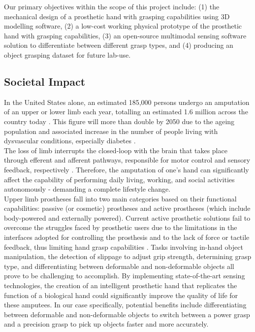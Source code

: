 \documentclass[11.5pt]{article}
\begin{document}
Our primary objectives within the scope of this project include: (1) the mechanical design of a prosthetic hand with grasping capabilities using 3D modelling software, (2) a low-cost working physical prototype of the prosthetic hand with grasping capabilities, (3) an open-source multimodal sensing software solution to differentiate between different grasp types, and (4) producing an object grasping dataset for future lab-use.

\subsection{Societal Impact}

In the United States alone, an estimated 185,000 persons undergo an amputation of an upper or lower limb each year, totalling an estimated 1.6 million across the country today \cite{Ziegler-Graham2008-cx}. This figure will more than double by 2050 due to the ageing population and associated increase in the number of people living with dysvascular conditions, especially diabetes \cite{Ziegler-Graham2008-cx}.\\

The loss of limb interrupts the closed-loop with the brain that takes place through efferent and afferent pathways, responsible for motor control and sensory feedback, respectively \cite{Cordella2016-ny}. Therefore, the amputation of one's hand can significantly affect the capability of performing daily living, working, and social activities autonomously - demanding a complete lifestyle change. \\

Upper limb prostheses fall into two main categories based on their functional capabilities: passive (or cosmetic) prostheses and active prostheses (which include body-powered and externally powered). Current active prosthetic solutions fail to overcome the struggles faced by prosthetic users due to the limitations in the interfaces adopted for controlling the prosthesis and to the lack of force or tactile feedback, thus limiting hand grasp capabilities \cite{Cordella2016-ny}. Tasks involving in-hand object manipulation, the detection of slippage to adjust grip strength, determining grasp type, and differentiating between deformable and non-deformable objects all prove to be challenging to accomplish. By implementing state-of-the-art sensing technologies, the creation of an intelligent prosthetic hand that replicates the function of a biological hand could significantly improve the quality of life for these amputees. In our case specifically, potential benefits include differentiating between deformable and non-deformable objects to switch between a power grasp and a precision grasp to pick up objects faster and more accurately. \\
\end{document}
